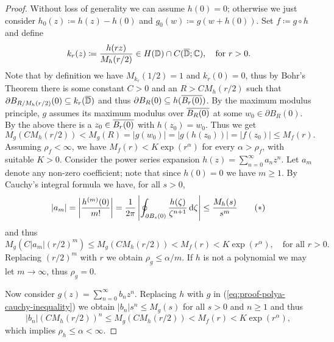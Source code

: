 \begin{proof}
    Without loss of generality we can assume $h(0) = 0$; otherwise we just consider $h_0(z) \coloneqq h(z) - h(0)$ and $g_0(w) \coloneqq g(w + h(0))$. Set $f \coloneqq g \circ h$ and define
    \begin{equation*}
        k_r(z) \coloneqq \frac{h(rz)}{M_h(r / 2)} \in H(\mathbb{D}) \cap C(\overline{\mathbb{D}}; \mathbb{C}), \quad \textrm{for } r > 0.
    \end{equation*}
    Note that by definition we have $M_{k_r}(1/2) = 1$ and $k_r(0) = 0$, thus by Bohr's Theorem there is some constant $C > 0$ and an $R > C M_h(r/2)$ such that $\partial B_{R / M_h(r/2)}(0) \subseteq k_r(\overline{\mathbb{D}})$ and thus $\partial B_R(0) \subseteq h(\overline{B_r(0)})$. By the maximum modulus principle, $g$ assumes its maximum modulus over $\overline{B_R(0)}$ at some $w_0 \in \partial B_R(0)$. By the above there is a $z_0 \in \overline{B_r(0)}$ with $h(z_0) = w_0$. Thus we get
    \begin{equation*}
        M_g(C M_h(r / 2)) < M_g(R) = \vert g(w_0) \vert = \vert g(h(z_0)) \vert = \vert f(z_0) \vert \leq M_f(r).
    \end{equation*}
    Assuming $\rho_f < \infty$, we have $M_f(r) < K \exp(r^\alpha)$ for every $\alpha > \rho_f$, with suitable $K > 0$. Consider the power series expansion $h(z) = \sum_{n=0}^\infty a_n z^n$. Let $a_m$ denote any non-zero coefficient; note that since $h(0) = 0$ we have $m \geq 1$. By Cauchy's integral formula we have, for all $s > 0$,
    \begin{equation*} \label{eq:proof-polya-cauchy-inequality}
        \vert a_m \vert = \left\vert \frac{h^{(m)}(0)}{m!} \right\vert = \frac{1}{2\pi} \left\vert \oint_{\partial B_{s}(0)} \frac{h(\zeta)}{\zeta^{n+1}} \mathop{}\!\mathrm{d} \zeta \right\vert \leq \frac{M_h(s)}{s^m} \tag{\textasteriskcentered}
    \end{equation*}
    and thus
    \begin{equation*}
        M_g(C \vert a_m \vert (r/2)^m) \leq M_g(C M_h(r/2)) < M_f(r) < K \exp(r^\alpha), \quad \textrm{for all } r > 0.
    \end{equation*}
    Replacing $(r/2)^m$ with $r$ we obtain $\rho_g \leq \alpha / m $. If $h$ is not a polynomial we may let $m \to \infty$, thus $\rho_g = 0$.

    Now consider $g(z) = \sum_{n=0}^\infty b_n z^n$. Replacing $h$ with $g$ in (\ref{eq:proof-polya-cauchy-inequality}) we obtain $\vert b_n \vert s^n \leq M_g(s)$ for all $s > 0$ and $n \geq 1$ and thus
    \begin{equation*}
        \vert b_n \vert (C M_h(r/2))^n \leq M_g(C M_h(r/2)) < M_f(r) < K \exp(r^\alpha),
    \end{equation*}
    which implies $\rho_h \leq \alpha < \infty$.
\end{proof}

